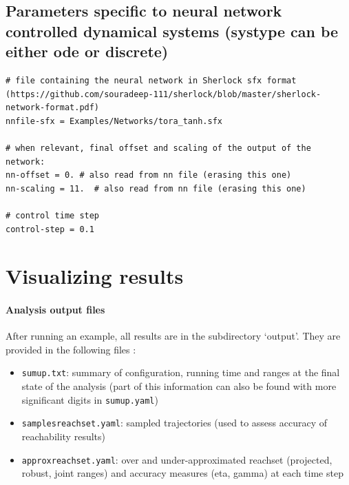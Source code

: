 \documentclass{article}
\begin{document}
\subsection{Parameters specific to neural network controlled dynamical systems (systype can be either ode or discrete)}

\begin{verbatim}
# file containing the neural network in Sherlock sfx format (https://github.com/souradeep-111/sherlock/blob/master/sherlock-network-format.pdf) 
nnfile-sfx = Examples/Networks/tora_tanh.sfx

# when relevant, final offset and scaling of the output of the network:
nn-offset = 0. # also read from nn file (erasing this one)
nn-scaling = 11.  # also read from nn file (erasing this one)

# control time step
control-step = 0.1
\end{verbatim}



\section{Visualizing results \label{visu}}

\paragraph{Analysis output files}
After running an example, all results are in the subdirectory ‘output’. They are provided in the following files : 
\begin{itemize}[noitemsep]
\item \texttt{sumup.txt}: summary of configuration, running time and ranges at the final state of the analysis (part of this information can also be found with more significant digits in \texttt{sumup.yaml})
\item \texttt{samplesreachset.yaml}: sampled trajectories (used to assess accuracy of reachability results)
\item \texttt{approxreachset.yaml}: over and under-approximated reachset (projected, robust, joint ranges) and accuracy measures (eta, gamma) at each time step 
\end{itemize}
\end{document}
